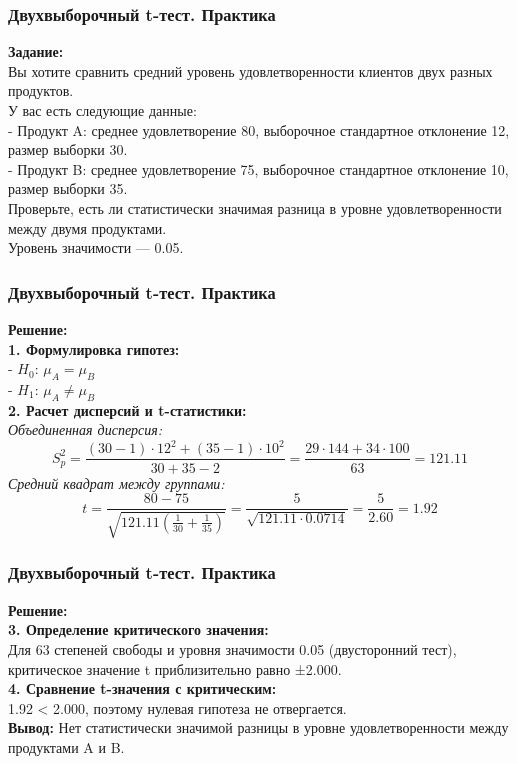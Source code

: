 \documentclass[aspectratio=169]{beamer}
\begin{document}
\begin{frame}
\frametitle{Двухвыборочный t-тест. Практика}
{\bf Задание:}\\
Вы хотите сравнить средний уровень удовлетворенности клиентов двух разных продуктов.\\
У вас есть следующие данные:\\
- Продукт A: среднее удовлетворение 80, выборочное стандартное отклонение 12, размер выборки 30.\\
- Продукт B: среднее удовлетворение 75, выборочное стандартное отклонение 10, размер выборки 35.\\
Проверьте, есть ли статистически значимая разница в уровне удовлетворенности между двумя продуктами.\\
Уровень значимости — 0.05.
\end{frame}

\begin{frame}
\frametitle{Двухвыборочный t-тест. Практика}
{\bf Решение:}\\
{\bf 1. Формулировка гипотез:}\\
- $H_0$: \( \mu_A = \mu_B \)\\
- $H_1$: \( \mu_A \ne \mu_B \)\\
{\bf 2. Расчет дисперсий и t-статистики:}\\
{\it Объединенная дисперсия:}
     \[
     S_p^2 = \frac{(30 - 1) \cdot 12^2 + (35 - 1) \cdot 10^2}{30 + 35 - 2} = \frac{29 \cdot 144 + 34 \cdot 100}{63} = 121.11
     \]
{\it Средний квадрат между группами:}
     \[
     t = \frac{80 - 75}{\sqrt{121.11 \left(\frac{1}{30} + \frac{1}{35}\right)}} = \frac{5}{\sqrt{121.11 \cdot 0.0714}} = \frac{5}{2.60} = 1.92
     \]
\end{frame}

\begin{frame}
\frametitle{Двухвыборочный t-тест. Практика}
{\bf Решение:}\\
{\bf 3. Определение критического значения:}\\
Для 63 степеней свободы и уровня значимости 0.05 (двусторонний тест), критическое значение t приблизительно равно ±2.000.\\
{\bf 4. Сравнение t-значения с критическим:}\\
1.92 < 2.000, поэтому нулевая гипотеза не отвергается.
\newline\\
{\bf Вывод:} Нет статистически значимой разницы в уровне удовлетворенности между продуктами A и B.
\end{frame}
\end{document}
